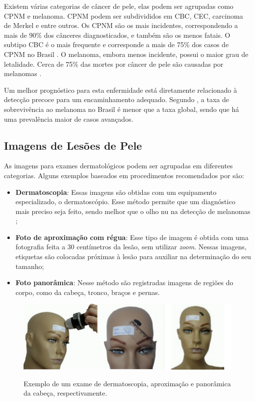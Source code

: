 Existem várias categorias de câncer de pele, elas podem ser agrupadas como \ac{CPNM} e melanoma. \ac{CPNM} podem ser subdivididos em \ac{CBC}, \ac{CEC}, carcinoma de
Merkel e entre outros. Os \ac{CPNM} são os mais incidentes, correspondendo a mais de 90\% dos cânceres diagnosticados, e também são os menos fatais. O subtipo \ac{CBC} é o
mais frequente e corresponde a mais de 75\% dos casos de \ac{CPNM} no Brasil \cite{skin_cancer_zink}. O melanoma, embora menos incidente, possui o maior grau de
letalidade. Cerca de 75\% das mortes por câncer de pele são causadas por melanomas \cite{skin_cancer_screening}.

Um melhor prognóstico para esta enfermidade está diretamente relacionado à detecção precoce para um encaminhamento adequado. Segundo \textcite{skin_cancer_survival}, a
taxa de sobrevivência ao melanoma no Brasil é menor que a taxa global, sendo que há uma prevalência maior de casos avançados.

\subsection{Imagens de Lesões de Pele} \label{sec:skin_lesion_images}

As imagens para exames dermatológicos podem ser agrupadas em diferentes categorias. Alguns exemplos baseados em procedimentos recomendados por
\textcite{fotos_dermatologia} são:

\begin{itemize}
      \item \textbf{Dermatoscopia}: Essas imagens são obtidas com um equipamento especializado, o dermatoscópio. Esse método permite que um
            diagnóstico mais preciso seja feito, sendo melhor que o olho nu na detecção de melanomas \cite{dermatoscopy};
      \item \textbf{Foto de aproximação com régua}: Esse tipo de imagem é obtida com uma fotografia feita a 30 centímetros da lesão,
            sem utilizar \textit{zoom}. Nessas imagens, etiquetas são colocadas próximas à lesão para auxiliar na determinação do seu tamanho;
      \item \textbf{Foto panorâmica}: Nesse método são registradas imagens de regiões do corpo, como da cabeça, tronco, braços e pernas.
\end{itemize}

\begin{figure}[ht]
      \centering
      \caption{\small Exemplo de um exame de dermatoscopia, aproximação e panorâmica da cabeça, respectivamente.}
      \includegraphics[width=1\columnwidth,keepaspectratio]{images/skin_lesion_exams.png}
      \label{fig:skin_lesion_exams}
\end{figure}

